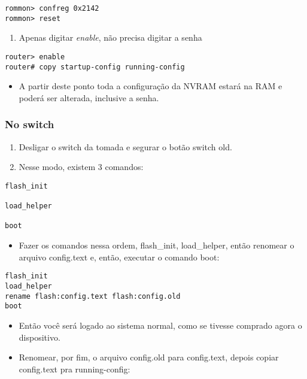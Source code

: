 \documentclass[]{article}
\begin{document}
\begin{verbatim}
rommon> confreg 0x2142
rommon> reset
\end{verbatim}

\begin{enumerate}
\def\labelenumi{\arabic{enumi}.}
\setcounter{enumi}{4}
\itemsep1pt\parskip0pt
\item
  Apenas digitar \emph{enable}, não precisa digitar a senha
\end{enumerate}

\begin{verbatim}
router> enable
router# copy startup-config running-config
\end{verbatim}

\begin{itemize}
\itemsep1pt\parskip0pt
\item
  A partir deste ponto toda a configuração da NVRAM estará na RAM e
  poderá ser alterada, inclusive a senha.
\end{itemize}

\subsubsection{No switch}\label{no-switch}

\begin{enumerate}
\def\labelenumi{\arabic{enumi}.}
\item
  Desligar o switch da tomada e segurar o botão switch old.
\item
  Nesse modo, existem 3 comandos:
\end{enumerate}

\begin{verbatim}
flash_init

load_helper

boot
\end{verbatim}

\begin{itemize}
\itemsep1pt\parskip0pt
\item
  Fazer os comandos nessa ordem, flash\_init, load\_helper, então
  renomear o arquivo config.text e, então, executar o comando boot:
\end{itemize}

\begin{verbatim}
flash_init
load_helper
rename flash:config.text flash:config.old
boot
\end{verbatim}

\begin{itemize}
\item
  Então você será logado ao sistema normal, como se tivesse comprado
  agora o dispositivo.
\item
  Renomear, por fim, o arquivo config.old para config.text, depois
  copiar config.text pra running-config:
\end{itemize}
\end{document}
